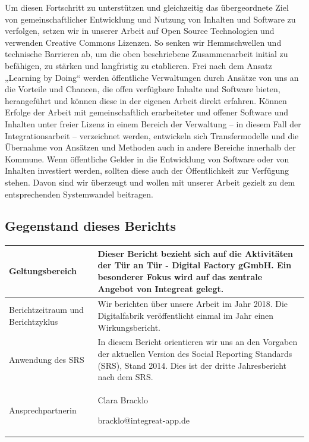 \documentclass[12pt, a4paper]{article} %
\begin{document}
Um diesen Fortschritt zu unterstützen und gleichzeitig das übergeordnete
Ziel von gemeinschaftlicher Entwicklung und Nutzung von Inhalten und
Software zu verfolgen, setzen wir in unserer Arbeit auf Open Source
Technologien und verwenden Creative Commons Lizenzen. So senken wir
Hemmschwellen und technische Barrieren ab, um die oben beschriebene
Zusammenarbeit initial zu befähigen, zu stärken und langfristig zu
etablieren. Frei nach dem Ansatz „Learning by Doing“ werden öffentliche
Verwaltungen durch Ansätze von uns an die Vorteile und Chancen, die
offen verfügbare Inhalte und Software bieten, herangeführt und können
diese in der eigenen Arbeit direkt erfahren. Können Erfolge der Arbeit
mit gemeinschaftlich erarbeiteter und offener Software und Inhalten
unter freier Lizenz in einem Bereich der Verwaltung – in diesem Fall der
Integrationsarbeit – verzeichnet werden, entwickeln sich Transfermodelle
und die Übernahme von Ansätzen und Methoden auch in andere Bereiche
innerhalb der Kommune. Wenn öffentliche Gelder in die Entwicklung von
Software oder von Inhalten investiert werden, sollten diese auch der
Öffentlichkeit zur Verfügung stehen. Davon sind wir überzeugt und wollen
mit unserer Arbeit gezielt zu dem entsprechenden Systemwandel beitragen.

\hypertarget{gegenstand-dieses-berichts}{%
\subsection{Gegenstand dieses
Berichts}\label{gegenstand-dieses-berichts}}

\begin{longtable}[]{@{}ll@{}}
\toprule
Geltungsbereich & Dieser Bericht bezieht sich auf die Aktivitäten der
Tür an Tür - Digital Factory gGmbH. Ein besonderer Fokus wird auf das
zentrale Angebot von Integreat gelegt.\tabularnewline
\midrule
\endhead
Berichtzeitraum und Berichtzyklus & Wir berichten über unsere Arbeit im
Jahr 2018. Die Digitalfabrik veröffentlicht einmal im Jahr einen
Wirkungsbericht.\tabularnewline
Anwendung des SRS & In diesem Bericht orientieren wir uns an den
Vorgaben der aktuellen Version des Social Reporting Standards (SRS),
Stand 2014. Dies ist der dritte Jahresbericht nach dem
SRS.\tabularnewline
\begin{minipage}[t]{0.47\columnwidth}\raggedright
Ansprechpartnerin\strut
\end{minipage} & \begin{minipage}[t]{0.47\columnwidth}\raggedright
Clara Bracklo

bracklo@integreat-app.de\strut
\end{minipage}\tabularnewline
\bottomrule
\end{longtable}
\end{document}

